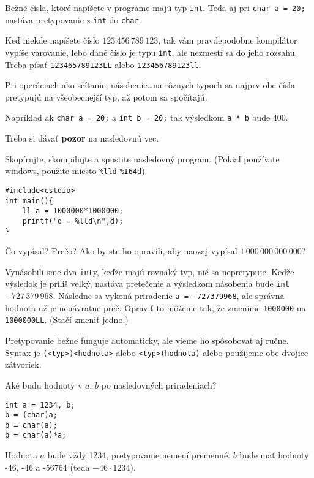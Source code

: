 \medskip

Bežné čísla, ktoré napíšete v programe majú typ \verb!int!.  Teda aj pri
\verb!char a = 20;! nastáva pretypovanie z \verb!int! do \verb!char!.

Keď niekde napíšete číslo $123\,456\,789\,123$, tak vám pravdepodobne kompilátor
vypíše varovanie, lebo dané číslo je typu \verb!int!, ale nezmestí sa do jeho
rozsahu. Treba písať \verb!123465789123LL! alebo \verb!123456789123ll!.

\medskip

Pri operáciach ako sčítanie, násobenie\dots na rôznych typoch sa najprv obe
čísla pretypujú na všeobecnejší typ, až potom sa spočítajú.

Napríklad ak \verb!char a = 20;! a \verb!int b = 20;! tak výsledkom \verb!a * b!
bude 400.

Treba si dávať \textbf{pozor} na nasledovnú vec.

\cvicenie Skopírujte, skompilujte a spustite nasledovný program.  (Pokiaľ
používate windows, použite miesto \verb!%lld! \verb!%I64d!)
\begin{lstlisting}
#include<cstdio>
int main(){
    ll a = 1000000*1000000;    
    printf("d = %lld\n",d);
}
\end{lstlisting}
Čo vypísal? Prečo? Ako by ste ho opravili, aby naozaj vypísal
$1\,000\,000\,000\,000$?

\riesenie Vynásobili sme dva \verb!int!y, keďže majú rovnaký typ, nič sa
nepretypuje.  Keďže výsledok je príliš veľký, nastáva pretečenie a výsledkom
násobenia bude \verb!int!  $-727\,379\,968$. Následne sa vykoná priradenie
\verb!a = -727379968!, ale správna hodnota už je nenávratne preč. Opraviť to
môžeme tak, že zmeníme \verb!1000000! na \verb!1000000LL!. (Stačí zmeniť
jedno.)

\medskip

Pretypovanie bežne funguje automaticky, ale vieme ho spôsobovať aj ručne.
Syntax je \verb!(<typ>)<hodnota>! alebo \verb!<typ>(hodnota)! alebo použijeme
obe dvojice zátvoriek.

\cvicenie Aké budu hodnoty v $a$, $b$ po nasledovných priradeniach? 
\begin{lstlisting}
int a = 1234, b;
b = (char)a;
b = char(a);
b = char(a)*a;
\end{lstlisting}

\riesenie Hodnota $a$ bude vždy 1234, pretypovanie nemení premenné. 
$b$ bude mať hodnoty -46, -46 a -56764 (teda $-46\cdot 1234$).

\medskip

